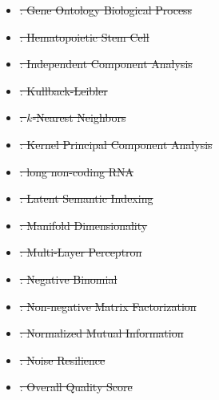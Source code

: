 \documentclass[referee, pdflatex, sn-vancouver-num]{sn-jnl}
\providecommand{\DIFdeltex}[1]{{\protect\color{red}\sout{#1}}}                      %
\providecommand{\DIFdel}[1]{\texorpdfstring{\DIFdeltex{#1}}{}} %
\begin{document}
\begin{appendices}
\begin{itemize}
{    }%
\item%
\DIFdel{: Gene Ontology Biological Process
    }%
\item%
\DIFdel{: Hematopoietic Stem Cell
    }%
\item%
\DIFdel{: Independent Component Analysis
    }%
\item%
\DIFdel{: Kullback-Leibler
    }%
\item%
\DIFdel{: $k$-Nearest Neighbors
    }%
\item%
\DIFdel{: Kernel Principal Component Analysis
    }%
\item%
\DIFdel{: long non-coding RNA
    }%
\item%
\DIFdel{: Latent Semantic Indexing
    }%
\item%
\DIFdel{: Manifold Dimensionality
    }%
\item%
\DIFdel{: Multi-Layer Perceptron
    }%
\item%
\DIFdel{: Negative Binomial
    }%
\item%
\DIFdel{: Non-negative Matrix Factorization
    }%
\item%
\DIFdel{: Normalized Mutual Information
    }%
\item%
\DIFdel{: Noise Resilience
    }%
\item%
\DIFdel{: Overall Quality Score
    }%

\end{itemize}
\end{appendices}
\end{document}
